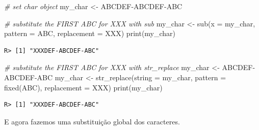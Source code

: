 \documentclass[
  11pt,
]{book}
\newenvironment{Shaded}{\begin{snugshade}}{\end{snugshade}}
\newcommand{\AttributeTok}[1]{\textcolor[rgb]{0.61,0.61,0.61}{#1}}
\newcommand{\CommentTok}[1]{\textcolor[rgb]{0.37,0.37,0.37}{\textit{#1}}}
\newcommand{\FunctionTok}[1]{\textcolor[rgb]{0,0,0}{#1}}
\newcommand{\NormalTok}[1]{#1}
\newcommand{\OtherTok}[1]{\textcolor[rgb]{0.37,0.37,0.37}{#1}}
\newcommand{\StringTok}[1]{\textcolor[rgb]{0.5,0.5,0.5}{#1}}
\begin{document}
\begin{Shaded}
\begin{Highlighting}[]
\CommentTok{\# set char object}
\NormalTok{my\_char }\OtherTok{\textless{}{-}} \StringTok{\textquotesingle{}ABCDEF{-}ABCDEF{-}ABC\textquotesingle{}}

\CommentTok{\# substitute the FIRST \textquotesingle{}ABC\textquotesingle{} for \textquotesingle{}XXX\textquotesingle{} with sub}
\NormalTok{my\_char }\OtherTok{\textless{}{-}} \FunctionTok{sub}\NormalTok{(}\AttributeTok{x =}\NormalTok{ my\_char,}
               \AttributeTok{pattern =} \StringTok{\textquotesingle{}ABC\textquotesingle{}}\NormalTok{,}
               \AttributeTok{replacement =} \StringTok{\textquotesingle{}XXX\textquotesingle{}}\NormalTok{)}
\FunctionTok{print}\NormalTok{(my\_char)}
\end{Highlighting}
\end{Shaded}

\begin{verbatim}
R> [1] "XXXDEF-ABCDEF-ABC"
\end{verbatim}

\begin{Shaded}
\begin{Highlighting}[]
\CommentTok{\# substitute the FIRST \textquotesingle{}ABC\textquotesingle{} for \textquotesingle{}XXX\textquotesingle{} with str\_replace}
\NormalTok{my\_char }\OtherTok{\textless{}{-}} \StringTok{\textquotesingle{}ABCDEF{-}ABCDEF{-}ABC\textquotesingle{}}
\NormalTok{my\_char }\OtherTok{\textless{}{-}} \FunctionTok{str\_replace}\NormalTok{(}\AttributeTok{string =}\NormalTok{ my\_char,}
                       \AttributeTok{pattern =} \FunctionTok{fixed}\NormalTok{(}\StringTok{\textquotesingle{}ABC\textquotesingle{}}\NormalTok{),}
                       \AttributeTok{replacement =} \StringTok{\textquotesingle{}XXX\textquotesingle{}}\NormalTok{)}
\FunctionTok{print}\NormalTok{(my\_char)}
\end{Highlighting}
\end{Shaded}

\begin{verbatim}
R> [1] "XXXDEF-ABCDEF-ABC"
\end{verbatim}

E agora fazemos uma substituição global dos caracteres.
\end{document}
